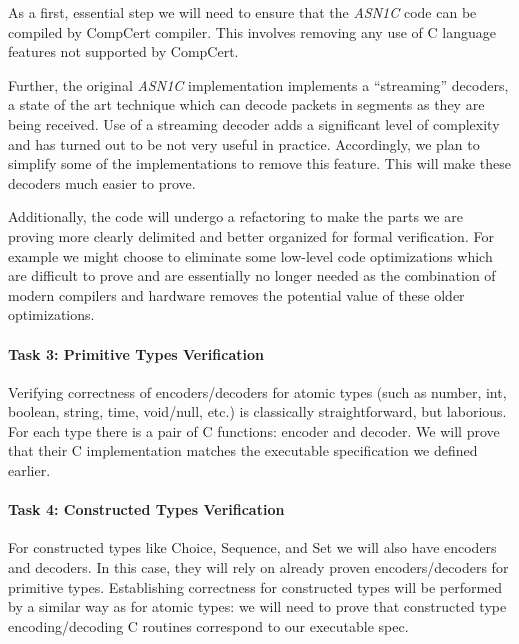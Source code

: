 \documentclass[acmsmall,nonacm]{acmart}
\begin{document}
As a first, essential step we will need to ensure that the \emph{ASN1C} code can be compiled by CompCert compiler. This involves removing any use of C language features not supported by CompCert.

Further, the original \emph{ASN1C} implementation implements a ``streaming'' decoders, a state of the art technique which can decode packets in segments as they are being received. Use of a streaming decoder adds a significant level of complexity and has turned out to be not very useful in practice. Accordingly, we plan to simplify some of the implementations to remove this feature. This will make these decoders much easier to prove.

Additionally, the code will undergo a refactoring to make the parts we are proving more clearly delimited and better organized for formal verification. For example we might choose to eliminate some low-level code optimizations which are difficult to prove and are essentially no longer needed as the combination of modern compilers and hardware removes the potential value of these older optimizations.

\paragraph{Task 3: Primitive Types Verification}
Verifying correctness of encoders/decoders for atomic types (such as number, int, boolean, string, time, void/null, etc.) is classically straightforward, but laborious. For each type there is a pair of C functions: encoder and decoder. We will prove that their C implementation matches the executable specification we defined earlier.

\paragraph{Task 4: Constructed Types Verification}
For constructed types like Choice, Sequence, and Set we will also have encoders and decoders. In this case, they will rely on already proven encoders/decoders for primitive types. Establishing correctness for constructed types will be performed by a similar way as for atomic types: we will need to prove that constructed type encoding/decoding C routines correspond to our executable spec. 
\end{document}

